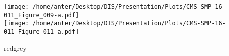 \documentclass{beamer}
\begin{document}
\begin{frame}
\begin{minipage}[thbp]{0.55\textwidth}
\begin{itemize}
\end{itemize}
\end{minipage}
\hspace{2mm}
\vspace{1mm}
\begin{minipage}[thbp]{0.3\textwidth}
\texttt{[image: /home/anter/Desktop/DIS/Presentation/Plots/CMS-SMP-16-011\_Figure\_009-a.pdf]}\\
\texttt{[image: /home/anter/Desktop/DIS/Presentation/Plots/CMS-SMP-16-011\_Figure\_011-a.pdf]}\\
\hspace*{18mm}\begin{beamercolorbox}[wd=23mm,ht=1mm,center,shadow=true, rounded=true]{redgrey}
{}
{\scalebox {0.61} {}}
\end{beamercolorbox}
\end{minipage}
\end{frame}
\end{document}
